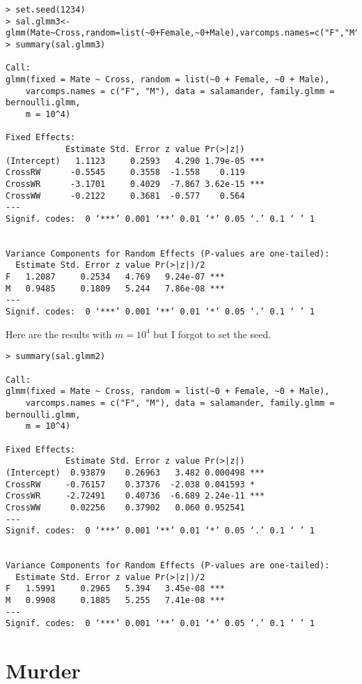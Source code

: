 \documentclass{article}
\begin{document}
\begin{verbatim}
> set.seed(1234)
> sal.glmm3<-glmm(Mate~Cross,random=list(~0+Female,~0+Male),varcomps.names=c("F","M"),data=salamander,family.glmm=bernoulli.glmm,m=10^4)
> summary(sal.glmm3)

Call:
glmm(fixed = Mate ~ Cross, random = list(~0 + Female, ~0 + Male), 
    varcomps.names = c("F", "M"), data = salamander, family.glmm = bernoulli.glmm, 
    m = 10^4)

Fixed Effects:
            Estimate Std. Error z value Pr(>|z|)    
(Intercept)   1.1123     0.2593   4.290 1.79e-05 ***
CrossRW      -0.5545     0.3558  -1.558    0.119    
CrossWR      -3.1701     0.4029  -7.867 3.62e-15 ***
CrossWW      -0.2122     0.3681  -0.577    0.564    
---
Signif. codes:  0 ‘***’ 0.001 ‘**’ 0.01 ‘*’ 0.05 ‘.’ 0.1 ‘ ’ 1


Variance Components for Random Effects (P-values are one-tailed):
  Estimate Std. Error z value Pr(>|z|)/2    
F   1.2087     0.2534   4.769   9.24e-07 ***
M   0.9485     0.1809   5.244   7.86e-08 ***
---
Signif. codes:  0 ‘***’ 0.001 ‘**’ 0.01 ‘*’ 0.05 ‘.’ 0.1 ‘ ’ 1

\end{verbatim}

Here are the results with $m=10^4$ but I forgot to set the seed.
\begin{verbatim}
> summary(sal.glmm2)

Call:
glmm(fixed = Mate ~ Cross, random = list(~0 + Female, ~0 + Male), 
    varcomps.names = c("F", "M"), data = salamander, family.glmm = bernoulli.glmm, 
    m = 10^4)

Fixed Effects:
            Estimate Std. Error z value Pr(>|z|)    
(Intercept)  0.93879    0.26963   3.482 0.000498 ***
CrossRW     -0.76157    0.37376  -2.038 0.041593 *  
CrossWR     -2.72491    0.40736  -6.689 2.24e-11 ***
CrossWW      0.02256    0.37902   0.060 0.952541    
---
Signif. codes:  0 ‘***’ 0.001 ‘**’ 0.01 ‘*’ 0.05 ‘.’ 0.1 ‘ ’ 1


Variance Components for Random Effects (P-values are one-tailed):
  Estimate Std. Error z value Pr(>|z|)/2    
F   1.5991     0.2965   5.394   3.45e-08 ***
M   0.9908     0.1885   5.255   7.41e-08 ***
---
Signif. codes:  0 ‘***’ 0.001 ‘**’ 0.01 ‘*’ 0.05 ‘.’ 0.1 ‘ ’ 1
\end{verbatim}

\section{Murder}
\end{document}
